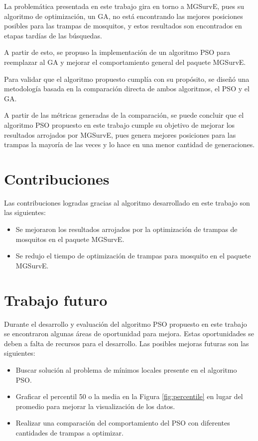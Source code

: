 \documentclass[letterpaper]{report}
\begin{document}
    La problemática presentada en este trabajo gira en torno a MGSurvE, pues su
    algoritmo de optimización, un GA, no está encontrando las mejores posiciones
    posibles para las trampas de mosquitos, y estos resultados son encontrados
    en etapas tardías de las búsquedas. 

    A partir de esto, se propuso la implementación de un algoritmo PSO para
    reemplazar al GA y mejorar el comportamiento general del paquete MGSurvE.

    Para validar que el algoritmo propuesto cumplía con su propósito, se diseñó
    una metodología basada en la comparación directa de ambos algoritmos, el PSO
    y el GA.
    
    A partir de las métricas generadas de la comparación, se puede concluir que
    el algoritmo PSO propuesto en este trabajo cumple su objetivo de mejorar
    los resultados arrojados por MGSurvE, pues genera mejores posiciones para
    las trampas la mayoría de las veces y lo hace en una menor cantidad de
    generaciones.

    \section{Contribuciones}

    Las contribuciones logradas gracias al algoritmo desarrollado en este
    trabajo son las siguientes:

    \begin{itemize}
      \item Se mejoraron los resultados arrojados por la optimización de trampas
        de mosquitos en el paquete MGSurvE.
      \item Se redujo el tiempo de optimización de trampas para mosquito en el
        paquete MGSurvE.
    \end{itemize}

    \section{Trabajo futuro}

    Durante el desarrollo y evaluación del algoritmo PSO propuesto en este
    trabajo se encontraron algunas áreas de oportunidad para mejora. Estas
    oportunidades se deben a falta de recursos para el desarrollo. Las posibles
    mejoras futuras son las siguientes:

    \begin{itemize}
      \item Buscar solución al problema de mínimos locales presente en el
        algoritmo PSO.
      \item Graficar el percentil 50 o la media en la Figura
        \ref{fig:percentile} en lugar del promedio para mejorar la visualización
        de los datos.
      \item Realizar una comparación del comportamiento del PSO con diferentes
        cantidades de trampas a optimizar.
    \end{itemize}    
\end{document}
